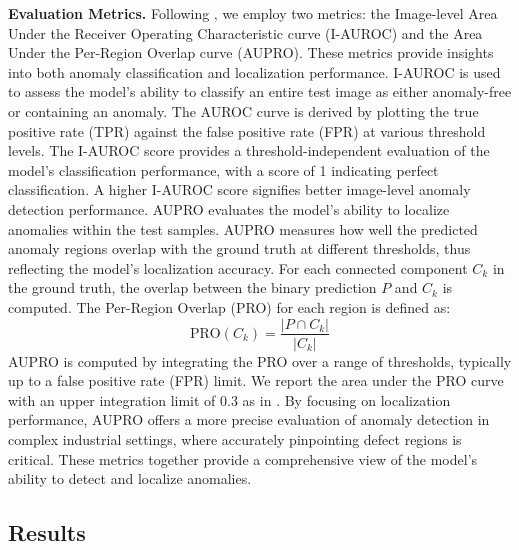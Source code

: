 \noindent \textbf{Evaluation Metrics.} Following \cite{bergmann2022mvtec, wang2023multimodal}, we employ two metrics: the Image-level Area Under the Receiver Operating Characteristic curve (I-AUROC) and the Area Under the Per-Region Overlap curve (AUPRO). These metrics provide insights into both anomaly classification and localization performance. I-AUROC is used to assess the model's ability to classify an entire test image as either anomaly-free or containing an anomaly. The AUROC curve is derived by plotting the true positive rate (TPR) against the false positive rate (FPR) at various threshold levels. The I-AUROC score provides a threshold-independent evaluation of the model's classification performance, with a score of 1 indicating perfect classification. A higher I-AUROC score signifies better image-level anomaly detection performance. AUPRO evaluates the model's ability to localize anomalies within the test samples. AUPRO measures how well the predicted anomaly regions overlap with the ground truth at different thresholds, thus reflecting the model's localization accuracy. For each connected component \( C_k \) in the ground truth, the overlap between the binary prediction \( P \) and \( C_k \) is computed. The Per-Region Overlap (PRO) for each region is defined as:
\begin{equation}
    \text{PRO}(C_k) = \frac{|P \cap C_k|}{|C_k|}
\end{equation}
AUPRO is computed by integrating the PRO over a range of thresholds, typically up to a false positive rate (FPR) limit.  We report the area under the PRO curve with an upper integration limit of 0.3 as in \cite{bergmann2022mvtec}. By focusing on localization performance, AUPRO offers a more precise evaluation of anomaly detection in complex industrial settings, where accurately pinpointing defect regions is critical. These metrics together provide a comprehensive view of the model's ability to detect and localize anomalies.

\subsection*{Results}

